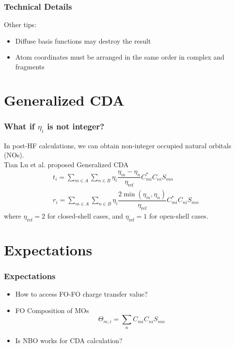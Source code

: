 \documentclass[10pt,aspectratio=43]{beamer}
\numberwithin{equation}{section}
\begin{document}
\begin{frame}
\frametitle{Technical Details}
Other tips:
\begin{itemize}
	\item Diffuse basis functions may destroy the result
	\item Atom coordinates must be arranged in the same order in complex and fragments
\end{itemize}
\end{frame}

\section{Generalized CDA}
\begin{frame}
\frametitle{What if $ \eta_i $ is not integer?}
In post-HF calculations, we can obtain non-integer occupied natural orbitals (NOs).\\
Tian Lu et al. proposed Generalized CDA
\begin{align}
t_i = \sum_{m\in A} \sum_{n\in B} \eta_i \dfrac{\eta_m - \eta_n}{\eta_{\text{ref}}}C_{mi}^* C_{ni}S_{mn} \\
r_i = \sum_{m\in A} \sum_{n\in B} \eta_i \dfrac{2\min(\eta_m, \eta_n)}{\eta_{\text{ref}}}C_{mi}^* C_{ni}S_{mn} 
\end{align}
where $ \eta_{\text{ref}} = 2 $ for closed-shell cases, and $ \eta_{\text{ref}}=1 $ for open-shell cases.\\
\hfill{}


\end{frame}

\section{Expectations}
\begin{frame}
\frametitle{Expectations}
\begin{itemize}
	\item How to access FO-FO charge transfer value?
	\item FO Composition of MOs
	\begin{equation}\label{key}
	\Theta_{m,i} = \sum_n C_{mi}C_{ni}S_{mn}
	\end{equation}
	\item Is NBO works for CDA calculation?
\end{itemize}

\end{frame}


	
\end{document}
